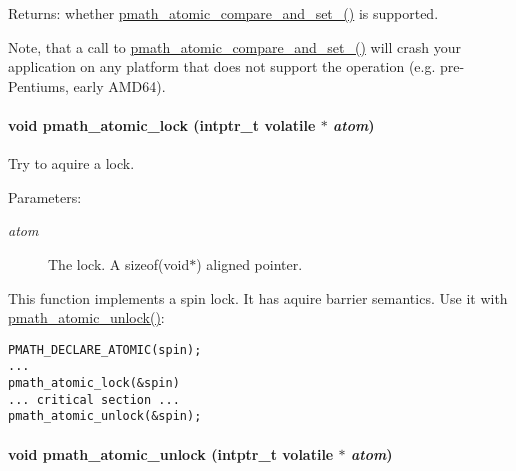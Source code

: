 \begin{Desc}
\item[Returns:]whether \hyperlink{group__atomic__ops_g868adc2a74d7aafbb0670922f61a21cc}{pmath\_\-atomic\_\-compare\_\-and\_\-set\_()} is supported.\end{Desc}
Note, that a call to \hyperlink{group__atomic__ops_g868adc2a74d7aafbb0670922f61a21cc}{pmath\_\-atomic\_\-compare\_\-and\_\-set\_()} will crash your application on any platform that does not support the operation (e.g. pre-Pentiums, early AMD64). \hypertarget{group__atomic__ops_gf143a22332da6a2065bac14069ecbf7f}{
\paragraph[{pmath\_\-atomic\_\-lock}]{\setlength{\rightskip}{0pt plus 5cm}void pmath\_\-atomic\_\-lock (intptr\_\-t volatile $\ast$ {\em atom})}\hfill}
\label{group__atomic__ops_gf143a22332da6a2065bac14069ecbf7f}


Try to aquire a lock. 

\begin{Desc}
\item[Parameters:]
\begin{description}
\item[{\em atom}]The lock. A sizeof(void$\ast$) aligned pointer.\end{description}
\end{Desc}
This function implements a spin lock. It has aquire barrier semantics. Use it with \hyperlink{group__atomic__ops_ga61bbbab4adc550cc66d1d5f9cf22afd}{pmath\_\-atomic\_\-unlock()}: 

\begin{Code}\begin{verbatim}PMATH_DECLARE_ATOMIC(spin);
...
pmath_atomic_lock(&spin)
... critical section ...
pmath_atomic_unlock(&spin);
\end{verbatim}
\end{Code}

 \hypertarget{group__atomic__ops_ga61bbbab4adc550cc66d1d5f9cf22afd}{
\paragraph[{pmath\_\-atomic\_\-unlock}]{\setlength{\rightskip}{0pt plus 5cm}void pmath\_\-atomic\_\-unlock (intptr\_\-t volatile $\ast$ {\em atom})}\hfill}
\label{group__atomic__ops_ga61bbbab4adc550cc66d1d5f9cf22afd}


